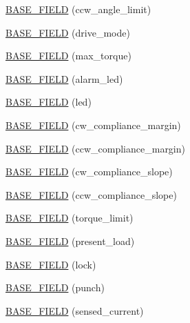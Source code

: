 \begin{DoxyCompactItemize}
\item 
\hyperlink{classdynamixel_1_1servos_1_1_base_servo_ac18bbfd90b36bc38b484f250e0e73395}{B\+A\+S\+E\+\_\+\+F\+I\+E\+LD} (ccw\+\_\+angle\+\_\+limit)
\item 
\hyperlink{classdynamixel_1_1servos_1_1_base_servo_a66d87963957d700b0cb3e5489280102d}{B\+A\+S\+E\+\_\+\+F\+I\+E\+LD} (drive\+\_\+mode)
\item 
\hyperlink{classdynamixel_1_1servos_1_1_base_servo_abfb2b375965a742dae13df7324a340a9}{B\+A\+S\+E\+\_\+\+F\+I\+E\+LD} (max\+\_\+torque)
\item 
\hyperlink{classdynamixel_1_1servos_1_1_base_servo_a6590f524917293ab98556346bac1981f}{B\+A\+S\+E\+\_\+\+F\+I\+E\+LD} (alarm\+\_\+led)
\item 
\hyperlink{classdynamixel_1_1servos_1_1_base_servo_a70470a70099add231dd287d5b69a3e05}{B\+A\+S\+E\+\_\+\+F\+I\+E\+LD} (led)
\item 
\hyperlink{classdynamixel_1_1servos_1_1_base_servo_abe0a74eeee4b456096d1ae2a114d91c2}{B\+A\+S\+E\+\_\+\+F\+I\+E\+LD} (cw\+\_\+compliance\+\_\+margin)
\item 
\hyperlink{classdynamixel_1_1servos_1_1_base_servo_aab9dc28556b2f869338111a3169829d9}{B\+A\+S\+E\+\_\+\+F\+I\+E\+LD} (ccw\+\_\+compliance\+\_\+margin)
\item 
\hyperlink{classdynamixel_1_1servos_1_1_base_servo_a3b9a6dda5ecd09debc17fe9fb72d255b}{B\+A\+S\+E\+\_\+\+F\+I\+E\+LD} (cw\+\_\+compliance\+\_\+slope)
\item 
\hyperlink{classdynamixel_1_1servos_1_1_base_servo_a84e568db5fcd8725ace1873c56545e39}{B\+A\+S\+E\+\_\+\+F\+I\+E\+LD} (ccw\+\_\+compliance\+\_\+slope)
\item 
\hyperlink{classdynamixel_1_1servos_1_1_base_servo_a33d2a6eed08c33fc4786404dd5399daa}{B\+A\+S\+E\+\_\+\+F\+I\+E\+LD} (torque\+\_\+limit)
\item 
\hyperlink{classdynamixel_1_1servos_1_1_base_servo_aa2e7a577c80aea887b05b53c76578acf}{B\+A\+S\+E\+\_\+\+F\+I\+E\+LD} (present\+\_\+load)
\item 
\hyperlink{classdynamixel_1_1servos_1_1_base_servo_a6a1cc09047bac429e7b50cf69a59e2e7}{B\+A\+S\+E\+\_\+\+F\+I\+E\+LD} (lock)
\item 
\hyperlink{classdynamixel_1_1servos_1_1_base_servo_ab9dde35a6228cfe48b2a58b0ab679de5}{B\+A\+S\+E\+\_\+\+F\+I\+E\+LD} (punch)
\item 
\hyperlink{classdynamixel_1_1servos_1_1_base_servo_a13f8ab07c4c2274c9b0191c7bb43a159}{B\+A\+S\+E\+\_\+\+F\+I\+E\+LD} (sensed\+\_\+current)
\item 

\end{DoxyCompactItemize}
